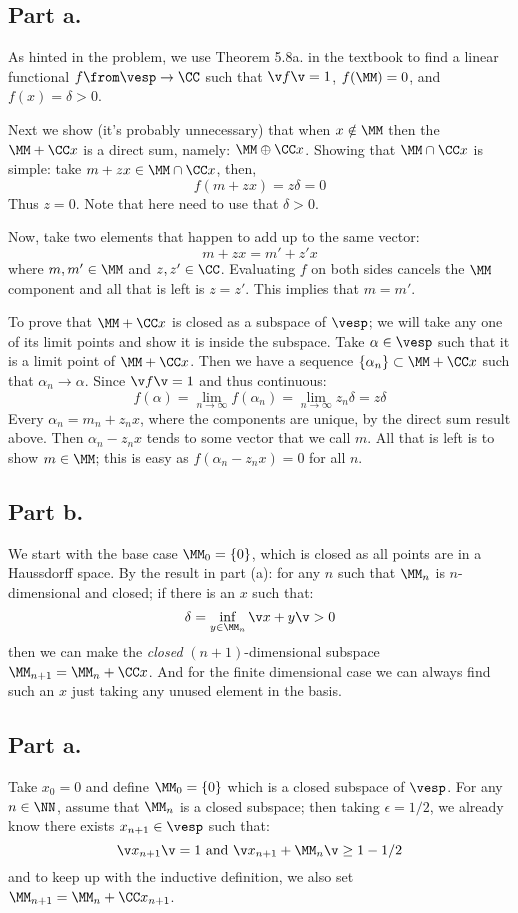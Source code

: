 \subsection*{Part \textbf{a.}}
As hinted in the problem, we use Theorem 5.8a. in the textbook to find a linear functional $f\from \vesp \to \CC$ such that $\v f\v=1$, $f(\MM)=0$, and $f(x)=\delta>0$.

Next we show (it's probably unnecessary) that when $x\notin \MM$ then the $\MM + \CC x$ is a direct sum, namely: $\MM \oplus \CC x$. 
Showing that $\MM\cap \CC x$ is simple: take $m+zx\in \MM \cap \CC x$, then, 
$$f(m+zx)=z\delta =0$$
Thus $z=0$. Note that here need to use that $\delta>0$.

Now, take two elements that happen to add up to the same vector:
$$m+zx = m'+z' x$$
where $m,m' \in \MM$ and $z,z'\in \CC$. 
Evaluating $f$ on both sides cancels the $\MM$ component and all that is left is $z=z'$. 
This implies that $m=m'$.

To prove that $\MM+\CC x$ is closed as a subspace of $\vesp$; we will take any one of its limit points and show it is inside the subspace.
Take $\alpha \in \vesp$ such that it is a limit point of $\MM+\CC x$.
Then we have a sequence $\{\alpha_n \}\subset \MM+\CC x$ such that $\alpha_n \to \alpha$.
Since $\v f\v=1$ and thus continuous:
$$f(\alpha) = \lim_{n\to \infty} f(\alpha_n)= \lim_{n\to \infty} z_n \delta = z\delta$$
Every $\alpha_n = m_n + z_n x$, where the components are unique, by the direct sum result above. 
Then $\alpha_n - z_n x$ tends to some vector that we call $m$. 
All that is left is to show $m\in \MM$; this is easy as $f(\alpha_n - z_n x) =0$ for all $n$.

\subsection*{Part \textbf{b.}}
We start with the base case $\MM_0 =\{0\}$, which is closed as all points are in a Haussdorff space.
By the result in part (a): for any $n$ such that $\MM_n$ is $n$-dimensional and closed; if there is an $x$ such that:
$$\delta=\inf_{y\in \MM_n}\v x+y\v>0$$
then we can make the \emph{closed} $(n+1)$-dimensional subspace $\MM_{n+1}=\MM_n + \CC x$. 
And for the finite dimensional case we can always find such an $x$ just taking any unused element in the basis.

\subsection*{Part \textbf{a.}}
Take $x_0=0 $ and define $\MM_0= \{0\}$ which is a closed subspace of $\vesp$.
For any $n\in \NN$, assume that $\MM_{n} $ is a closed subspace; then taking $\epsilon = 1/2$, we already know there
exists $x_{n+1}\in \vesp$ such that:
$$\v x_{n+1}\v = 1 \text{ and } \v x_{n+1} + \MM_n \v \geq 1-1/2$$
and to keep up with the inductive definition, we also set $\MM_{n+1} = \MM_n+\CC x_{n+1}$.

